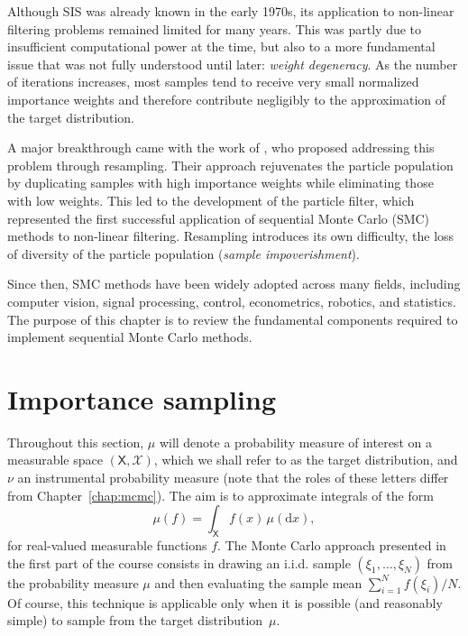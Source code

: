 \documentclass[english,graybox,envcountchap,envcountsame,sectrefs,shortlabels]{svmono}
\theoremstyle{style}
\newcommand{\eqsp}{}
\begin{document}
Although SIS was already known in the early 1970s, its application to non-linear filtering problems remained limited for many years. This was partly due to insufficient computational power at the time, but also to a more fundamental issue that was not fully understood until later: \emph{weight degeneracy}. As the number of iterations increases, most samples tend to receive very small normalized importance weights and therefore contribute negligibly to the approximation of the target distribution.

A major breakthrough came with the work of \cite{GordonSalmondSmith1993}, who proposed addressing this problem through resampling. Their approach rejuvenates the particle population by duplicating samples with high importance weights while eliminating those with low weights. This led to the development of the particle filter, which represented the first successful application of sequential Monte Carlo (SMC) methods to non-linear filtering. Resampling introduces its own difficulty, the loss of diversity of the particle population (\emph{sample impoverishment}).

Since then, SMC methods have been widely adopted across many fields, including computer vision, signal processing, control, econometrics, robotics, and statistics. The purpose of this chapter is to review the fundamental components required to implement sequential Monte Carlo methods.


\section{Importance sampling}
\label{sec:is}

Throughout this section, $\mu$ will denote a probability measure of interest on a
measurable space $(\mathsf{X}, \mathcal{X})$, which we shall refer to as the target
distribution, and $\nu$ an instrumental probability measure (note that the roles of these letters differ from Chapter~\ref{chap:mcmc}). The aim is to approximate integrals of the form
\[
\mu(f) = \int_{\mathsf{X}} f(x)\,\mu(\mathrm{d}x)\eqsp,
\]
for real-valued measurable functions $f$. The Monte Carlo approach presented in the first part of the course consists in drawing an i.i.d. sample
$(\xi_1, \ldots, \xi_N)$ from the probability measure $\mu$ and then evaluating the
sample mean $\sum_{i=1}^N f(\xi_i)/N$. Of course, this technique is applicable only when it is possible (and reasonably
simple) to sample from the target distribution~$\mu$.
\end{document}
